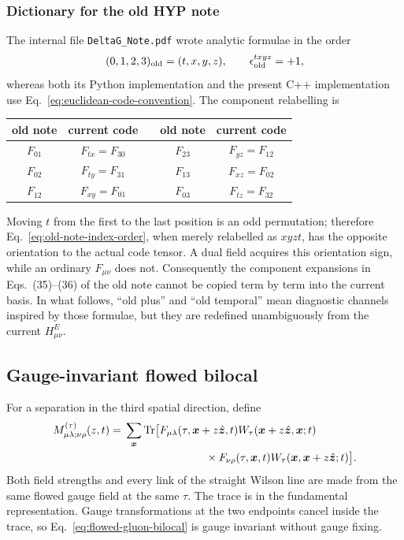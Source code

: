 \documentclass[11pt]{article}
\numberwithin{equation}{section}
\DeclareMathOperator{\Tr}{Tr}
\begin{document}
\subsubsection{Dictionary for the old HYP note}

The internal file \texttt{DeltaG\_Note.pdf} wrote analytic formulae in the
order
\begin{equation}
 (0,1,2,3)_{\rm old}=(t,x,y,z),
 \qquad \epsilon_{\rm old}^{txyz}=+1,
 \label{eq:old-note-index-order}
\end{equation}
whereas both its Python implementation and the present C++ implementation use
Eq.~\eqref{eq:euclidean-code-convention}.  The component relabelling is
\begin{center}
\small
\begin{tabular}{c@{\(\;\longrightarrow\;\)}c c@{\qquad}c@{\(\;\longrightarrow\;\)}c}
\toprule
old note & current code & & old note & current code\\
\midrule
\(F_{01}\) & \(F_{tx}=F_{30}\) && \(F_{23}\) & \(F_{yz}=F_{12}\)\\
\(F_{02}\) & \(F_{ty}=F_{31}\) && \(F_{13}\) & \(F_{xz}=F_{02}\)\\
\(F_{12}\) & \(F_{xy}=F_{01}\) && \(F_{03}\) & \(F_{tz}=F_{32}\)\\
\bottomrule
\end{tabular}
\end{center}
Moving \(t\) from the first to the last position is an odd permutation;
therefore Eq.~\eqref{eq:old-note-index-order}, when merely relabelled as
\(xyzt\), has the opposite orientation to the actual code tensor.  A dual
field acquires this orientation sign, while an ordinary \(F_{\mu\nu}\) does
not.  Consequently the component expansions in Eqs.~(35)--(36) of the old
note cannot be copied term by term into the current basis.  In what follows,
``old plus'' and ``old temporal'' mean diagnostic channels inspired by those
formulae, but they are redefined unambiguously from the current \(H^E_{\mu\nu}\).

\subsection{Gauge-invariant flowed bilocal}

For a separation in the third spatial direction, define
\begin{align}
  M_{\mu\lambda;\nu\rho}^{(\tau)}(z,t)
  ={}&\sum_{\bm x}\Tr\bigl[
  F_{\mu\lambda}(\tau,\bm x+z\hat{\bm z},t)
  W_\tau(\bm x+z\hat{\bm z},\bm x;t)\nonumber\\
  &\hspace{2.6cm}\times
  F_{\nu\rho}(\tau,\bm x,t)
  W_\tau(\bm x,\bm x+z\hat{\bm z};t)
  \bigr].
  \label{eq:flowed-gluon-bilocal}
\end{align}
Both field strengths and every link of the straight Wilson line are made from
the same flowed gauge field at the same \(\tau\).  The trace is in the
fundamental representation.  Gauge transformations at the two endpoints
cancel inside the trace, so Eq.~\eqref{eq:flowed-gluon-bilocal} is gauge
invariant without gauge fixing.
\end{document}

